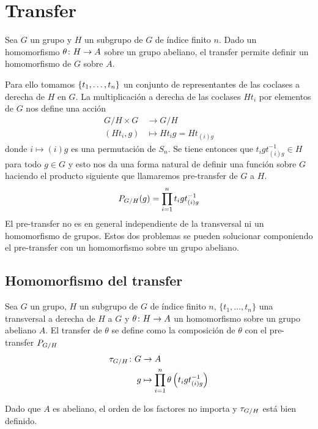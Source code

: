 
\chapter{Transfer}

Sea $G$ un grupo y $H$ un subgrupo de $G$ de índice finito $n$. Dado un homomorfismo $\theta\colon H\to A$ sobre un grupo abeliano, el transfer permite definir un homomorfismo de $G$ sobre $A$. %

Para ello tomamos $\{t_1,\ldots,t_n\}$ un conjunto de representantes de las coclases a derecha de $H$ en $G$. La multiplicación a derecha de las coclases $Ht_i$ por elementos de $G$ nos define una acción
\begin{align}\label{minitransfer}
	G/H\times G &\to {G/H} \nonumber\\
	(Ht_i,g) &\mapsto Ht_ig = Ht_{(i)g}
\end{align}
donde $i\mapsto (i)g$ es una permutación de $S_n$. Se tiene entonces que $t_igt_{(i)g}^{-1}\in H$ para todo $g\in G$ y esto nos da una forma natural de definir una función sobre $G$ haciendo el producto siguiente que llamaremos pre-transfer de $G$ a $H$.
\begin{equation}
	{P_{G/ H}}(g)= \prod_{i=1}^n t_igt_{(i)g}^{-1}
\end{equation}
El pre-transfer no es en general independiente de la transversal ni un homomorfismo de grupos. Estos dos problemas se pueden solucionar componiendo el pre-transfer con un homomorfismo sobre un grupo abeliano. %

\section{Homomorfismo del transfer}

\begin{definicion}
	Sea $G$ un grupo, $H$ un subgrupo de $G$ de índice finito $n$, $\{t_1,\ldots, t_n\}$ una transversal a derecha de $H$ a $G$ y $\theta\colon H\to A$ un homomorfismo sobre un grupo abeliano $A$. El transfer de $\theta$ se define como la composición de $\theta$ con el pre-transfer $P_{G/ H}$
	\begin{align}
		{\tau_{G/ H}} \colon 	G &\to A \nonumber \\
							g &\mapsto \prod_{i=1}^n \theta\left(t_igt_{(i)g}^{-1}\right)
	\end{align}
	
	Dado que $A$ es abeliano, el orden de los factores no importa y $\tau_{G/ H}$ está bien definido.  %
\end{definicion}

